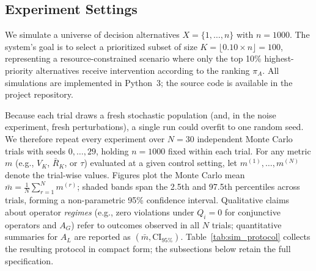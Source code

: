 \documentclass[mathematics,article,submit,moreauthors]{Definitions/mdpi}
\begin{document}
\subsection{Experiment Settings}\label{subsect:experiment_settings}

We simulate a universe of decision alternatives $X = \{1, \dots, n\}$ with $n = 1000$. The system's goal is to select a prioritized subset of size $K = \lfloor 0.10 \times n \rfloor = 100$, representing a resource-constrained scenario where only the top 10\% highest-priority alternatives receive intervention according to the ranking $\pi_A$. All simulations are implemented in Python~3; the source code is available in the project repository.

Because each trial draws a fresh stochastic population (and, in the noise experiment, fresh perturbations), a single run could overfit to one random seed. We therefore repeat every experiment over $N = 30$ independent Monte Carlo trials with seeds $0, \dots, 29$, holding $n = 1000$ fixed within each trial. For any metric $m$ (e.g., $V_K$, $\bar{R}_K$, or $\tau$) evaluated at a given control setting, let $m^{(1)}, \dots, m^{(N)}$ denote the trial-wise values. Figures plot the Monte Carlo mean $\bar{m} = \frac{1}{N}\sum_{r=1}^{N} m^{(r)}$; shaded bands span the 2.5th and 97.5th percentiles across trials, forming a non-parametric 95\% confidence interval. Qualitative claims about operator \emph{regimes} (e.g., zero violations under $Q_i = 0$ for conjunctive operators and $A_G$) refer to outcomes observed in all $N$ trials; quantitative summaries for $A_L$ are reported as $(\bar{m}, \text{CI}_{95\%})$. Table~\ref{tab:sim_protocol} collects the resulting protocol in compact form; the subsections below retain the full specification.
\end{document}
